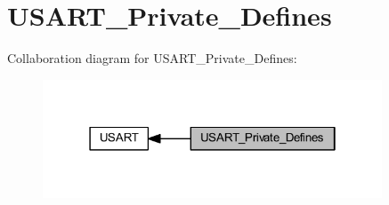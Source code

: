 \hypertarget{group___u_s_a_r_t___private___defines}{}\section{U\+S\+A\+R\+T\+\_\+\+Private\+\_\+\+Defines}
\label{group___u_s_a_r_t___private___defines}
Collaboration diagram for U\+S\+A\+R\+T\+\_\+\+Private\+\_\+\+Defines\+:
\nopagebreak
\begin{figure}[H]
\begin{center}
\leavevmode
\includegraphics[width=286pt]{group___u_s_a_r_t___private___defines}
\end{center}
\end{figure}
